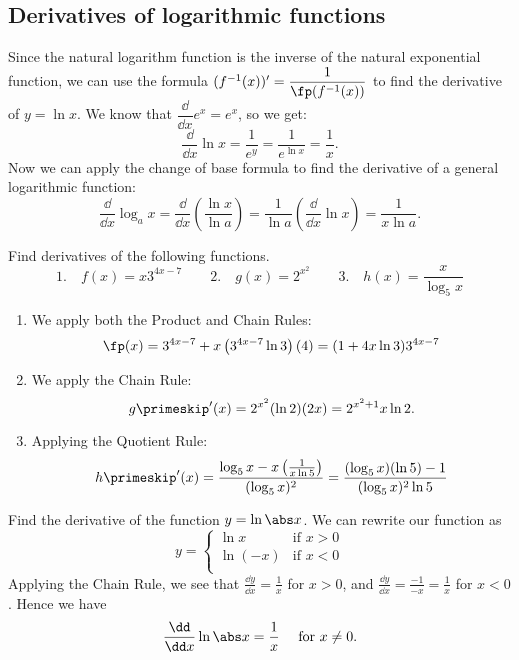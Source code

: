 \subsection{Derivatives of logarithmic functions}

Since the natural logarithm function is the inverse of the natural exponential function, we can use the formula $(f^{-1}(x))'=\dfrac1{\fp(f^{-1}(x))}$ to find the derivative of $y=\ln x$. We know that $\dfrac\dd{\dd x}e^x=e^x$, so we get:
\[\frac\dd{\dd x}\ln x=\frac1{e^y}=\frac1{e^{\ln x}}=\frac1x.\]
Now we
can apply the change of base formula to find the derivative of a general logarithmic function:
\[\frac{\dd}{\dd x}\log_ax=\frac{\dd}{\dd x}\left(\frac{\ln x}{\ln a}\right) =\frac 1{\ln a}\left(\frac{\dd}{\dd x}\ln x\right)=\frac 1{x\ln a}.\]

\begin{example}\label{ex_find_d_exp_log}%
Find derivatives of the following functions.
\[
 \text{1.}\quad f(x)=x3^{4x-7}\qquad
 \text{2.}\quad g(x)=2^{x^2}\qquad
 \text{3.}\quad h(x)=\frac x{\log_5x}
\]
\solution
\begin{enumerate}
\item We apply both the Product and Chain Rules:
\[\fp(x)=3^{4x-7}+x\left(3^{4x-7}\ln 3\right)(4)=(1+4x\ln 3)3^{4x-7}\]
\item We apply the Chain Rule:
\[g\primeskip'(x)=2^{x^2}(\ln 2)(2x)=2^{x^2+1}x\ln2.\]
\item Applying the Quotient Rule:
\[h\primeskip'(x)=\frac{\log_5x-x\left(\frac1{x\ln 5}\right)}{(\log_5x)^2}=\frac{(\log_5x)(\ln 5)-1}{(\log_5x)^2\ln 5}\]
\end{enumerate}
\end{example}

\begin{example}\label{ex_d_ln_abs_x}%
Find the derivative of the function $y=\ln\abs x$.
\solution
We can rewrite our function as
\[y=\begin{cases} \ln x & \text{if $x>0$}\\ \ln(-x) & \text{if $x<0$}\\ \end{cases}\]
Applying the Chain Rule, we see that $\frac{\dd y}{\dd x}=\frac 1x$ for $x>0$, and $\frac{\dd y}{\dd x}=\frac{-1}{-x}=\frac 1x$ for $x<0$. Hence we have
\[\frac{\dd}{\dd x}\ln\abs x=\frac 1x \quad\text{ for $x\neq0$.}\]
\end{example}

